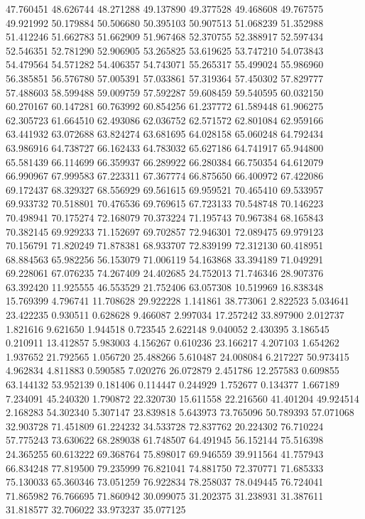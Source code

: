 47.760451
48.626744
48.271288
49.137890
49.377528
49.468608
49.767575
49.921992
50.179884
50.506680
50.395103
50.907513
51.068239
51.352988
51.412246
51.662783
51.662909
51.967468
52.370755
52.388917
52.597434
52.546351
52.781290
52.906905
53.265825
53.619625
53.747210
54.073843
54.479564
54.571282
54.406357
54.743071
55.265317
55.499024
55.986960
56.385851
56.576780
57.005391
57.033861
57.319364
57.450302
57.829777
57.488603
58.599488
59.009759
57.592287
59.608459
59.540595
60.032150
60.270167
60.147281
60.763992
60.854256
61.237772
61.589448
61.906275
62.305723
61.664510
62.493086
62.036752
62.571572
62.801084
62.959166
63.441932
63.072688
63.824274
63.681695
64.028158
65.060248
64.792434
63.986916
64.738727
66.162433
64.783032
65.627186
64.741917
65.944800
65.581439
66.114699
66.359937
66.289922
66.280384
66.750354
64.612079
66.990967
67.999583
67.223311
67.367774
66.875650
66.400972
67.422086
69.172437
68.329327
68.556929
69.561615
69.959521
70.465410
69.533957
69.933732
70.518801
70.476536
69.769615
67.723133
70.548748
70.146223
70.498941
70.175274
72.168079
70.373224
71.195743
70.967384
68.165843
70.382145
69.929233
71.152697
69.702857
72.946301
72.089475
69.979123
70.156791
71.820249
71.878381
68.933707
72.839199
72.312130
60.418951
68.884563
65.982256
56.153079
71.006119
54.163868
33.394189
71.049291
69.228061
67.076235
74.267409
24.402685
24.752013
71.746346
28.907376
63.392420
11.925555
46.553529
21.752406
63.057308
10.519969
16.838348
15.769399
4.796741
11.708628
29.922228
1.141861
38.773061
2.822523
5.034641
23.422235
0.930511
0.628628
9.466087
2.997034
17.257242
33.897900
2.012737
1.821616
9.621650
1.944518
0.723545
2.622148
9.040052
2.430395
3.186545
0.210911
13.412857
5.983003
4.156267
0.610236
23.166217
4.207103
1.654262
1.937652
21.792565
1.056720
25.488266
5.610487
24.008084
6.217227
50.973415
4.962834
4.811883
0.590585
7.020276
26.072879
2.451786
12.257583
0.609855
63.144132
53.952139
0.181406
0.114447
0.244929
1.752677
0.134377
1.667189
7.234091
45.240320
1.790872
22.320730
15.611558
22.216560
41.401204
49.924514
2.168283
54.302340
5.307147
23.839818
5.643973
73.765096
50.789393
57.071068
32.903728
71.451809
61.224232
34.533728
72.837762
20.224302
76.710224
57.775243
73.630622
68.289038
61.748507
64.491945
56.152144
75.516398
24.365255
60.613222
69.368764
75.898017
69.946559
39.911564
41.757943
66.834248
77.819500
79.235999
76.821041
74.881750
72.370771
71.685333
75.130033
65.360346
73.051259
76.922834
78.258037
78.049445
76.724041
71.865982
76.766695
71.860942
30.099075
31.202375
31.238931
31.387611
31.818577
32.706022
33.973237
35.077125
